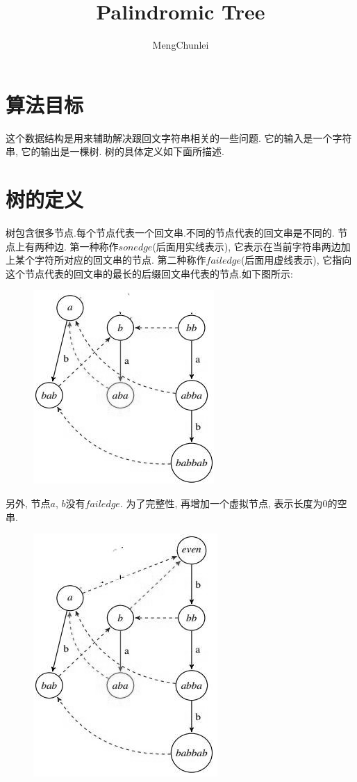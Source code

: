 \documentclass{article}
\title{Palindromic Tree}
\author{MengChunlei}
\begin{document}
\maketitle
\section{算法目标}
这个数据结构是用来辅助解决跟回文字符串相关的一些问题. 它的输入是一个字符串, 它的输出是一棵树. 树的具体定义如下面所描述.
\section{树的定义}
树包含很多节点.每个节点代表一个回文串.不同的节点代表的回文串是不同的. 节点上有两种边. 第一种称作$sonedge$(后面用实线表示), 它表示在当前字符串两边加上某个字符所对应的回文串的节点. 第二种称作$failedge$(后面用虚线表示), 它指向这个节点代表的回文串的最长的后缀回文串代表的节点.如下图所示: \par

\begin{figure}[h]
\centering\includegraphics[scale=0.6]{pic1.png} \par
\end{figure}
另外, 节点$a$, $b$没有$failedge$. 为了完整性, 再增加一个虚拟节点, 表示长度为0的空串.  \par
\begin{figure}[h]
\centering\includegraphics[scale=0.6]{pic2.png} \par
\end{figure}
\end{document}
